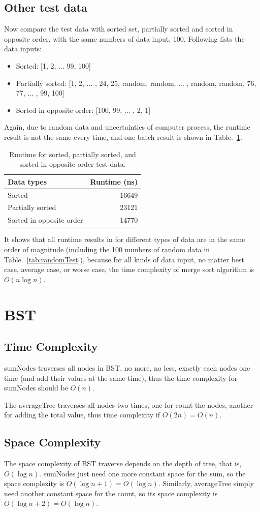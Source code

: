 \documentclass[natbib,12pt]{article}
\begin{document}
\subsection{Other test data}
Now compare the test data with sorted set, partially sorted and sorted in opposite order, with the same numbers of data input, 100.
Following lists the data inputs:
\begin{itemize}
	\item Sorted: [1, 2, ...  99, 100]
	\item Partially sorted: [1, 2, ... , 24, 25, random, random, ... , random, random, 76, 77, ... , 99, 100]
	\item Sorted in opposite order: [100, 99, ... , 2, 1]
\end{itemize}

Again, due to random data and uncertainties of computer process, the runtime result is not the same every time, and one batch result is shown in Table.~\ref{tab:otherTest}.

	\begin{table}[htpb]
	\centering
	\begin{tabular}{l|r}
		Data types & Runtime (ns) \\\hline
		Sorted & 16649 \\
		Partially sorted & 23121  \\
		Sorted in opposite order & 14770 
	\end{tabular}
	\caption{\label{tab:otherTest}Runtime for sorted, partially sorted, and sorted in opposite order test data.}
\end{table}

It shows that all runtime results in for different types of data are in the same order of magnitude (including the 100 numbers of random data in Table.~\ref{tab:randomTest}), because for all kinds of data input, no matter best case, average case, or worse case, the time complexity of merge sort algorithm is $O(n\log n)$.

\section{BST}
\subsection{Time Complexity}
sumNodes traverses all nodes in BST, no more, no less, exactly each nodes one time (and add their values at the same time), thus the time complexity for sumNodes should be $O(n)$. 

The averageTree traverses all nodes two times, one for count the nodes, another for adding the total value, thus time complexity if $O(2n) = O(n)$.

\subsection{Space Complexity}
The space complexity of BST traverse depends on the depth of tree, that is, $O(\log n)$. sumNodes just need one more constant space for the sum, so the space complexity is $O(\log n + 1) = O(\log n)$. Similarly, averageTree simply need another constant space for the count, so its space complexity is $O(\log n + 2) = O(\log n)$. 
\end{document}
